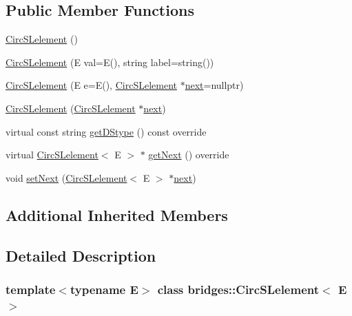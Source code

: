 \subsection*{Public Member Functions}
\begin{DoxyCompactItemize}
\item 
\mbox{\hyperlink{classbridges_1_1_circ_s_lelement_a86183d3487b906550d8f32bda3a68f98}{Circ\+S\+Lelement}} ()
\item 
\mbox{\hyperlink{classbridges_1_1_circ_s_lelement_a765032df6cfaa7cf7589c9e0df29bae4}{Circ\+S\+Lelement}} (E val=E(), string label=string())
\item 
\mbox{\hyperlink{classbridges_1_1_circ_s_lelement_a0dd7605959b4b52de041e9bcbe5abce7}{Circ\+S\+Lelement}} (E e=E(), \mbox{\hyperlink{classbridges_1_1_circ_s_lelement}{Circ\+S\+Lelement}} $\ast$\mbox{\hyperlink{classbridges_1_1_s_lelement_ad7449d10a09ebc52653a7baed812aa43}{next}}=nullptr)
\item 
\mbox{\hyperlink{classbridges_1_1_circ_s_lelement_a1fda146fc0da1d8c7d6440cbbbb2ce42}{Circ\+S\+Lelement}} (\mbox{\hyperlink{classbridges_1_1_circ_s_lelement}{Circ\+S\+Lelement}} $\ast$\mbox{\hyperlink{classbridges_1_1_s_lelement_ad7449d10a09ebc52653a7baed812aa43}{next}})
\item 
virtual const string \mbox{\hyperlink{classbridges_1_1_circ_s_lelement_a4b27c205af46162371e3ffe05cbbe3d5}{get\+D\+Stype}} () const override
\item 
virtual \mbox{\hyperlink{classbridges_1_1_circ_s_lelement}{Circ\+S\+Lelement}}$<$ E $>$ $\ast$ \mbox{\hyperlink{classbridges_1_1_circ_s_lelement_aab863627c125c6f1075af7e7b7f340cf}{get\+Next}} () override
\item 
void \mbox{\hyperlink{classbridges_1_1_circ_s_lelement_a7b2512dd1cc559f0a89d9ab4aafed172}{set\+Next}} (\mbox{\hyperlink{classbridges_1_1_circ_s_lelement}{Circ\+S\+Lelement}}$<$ E $>$ $\ast$\mbox{\hyperlink{classbridges_1_1_s_lelement_ad7449d10a09ebc52653a7baed812aa43}{next}})
\end{DoxyCompactItemize}
\subsection*{Additional Inherited Members}


\subsection{Detailed Description}
\subsubsection*{template$<$typename E$>$\newline
class bridges\+::\+Circ\+S\+Lelement$<$ E $>$}

